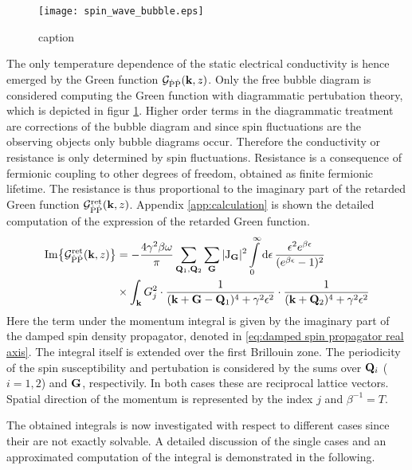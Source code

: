%
\begin{figure}
	\centering
	\texttt{[image: spin\_wave\_bubble.eps]}
	\caption{caption}
	\label{fig:spin wave bubble}
\end{figure}
%
The only temperature dependence of the static electrical conductivity is hence emerged by the Green function $\mathcal{G}_{\dot{\mathrm{P}}\dot{\mathrm{P}}}(\vb{k}, z)$.
Only the free bubble diagram is considered computing the Green function with diagrammatic pertubation theory, which is depicted in figur \ref{fig:spin wave bubble}.
Higher order terms in the diagrammatic treatment are corrections of the bubble diagram and since spin fluctuations are the observing objects only bubble diagrams occur.
Therefore the conductivity or resistance is only determined by spin fluctuations.
Resistance is a consequence of fermionic coupling to other degrees of freedom, obtained as finite fermionic lifetime.
The resistance is thus proportional to the imaginary part of the retarded Green function $\mathcal{G}_{\dot{\mathrm{P}}\dot{\mathrm{P}}}^{\mathrm{ret}}(\vb{k}, z)$.
Appendix \ref{app:calculation} is shown the detailed computation of the expression of the retarded Green function.
%
\begin{align}
	\Im{\mathcal{G}_{\dot{\mathrm{P}}\dot{\mathrm{P}}}^{\mathrm{ret}}(\vb{k}, z)} &= 
		-\frac{4 \gamma^{2} \beta \omega}{\pi}
		\sum\limits_{\vb{Q}_{1}, \vb{Q}_{2}}
		\sum\limits_{\vb{G}}
		\vert \mathrm{J}_{\vb{G}} \vert^{2}
		\int\limits_{0}^{\infty} \dd{\epsilon}
		\frac{\epsilon^{2} e^{\beta \epsilon}}{(e^{\beta \epsilon} - 1)^{2}}
		\notag \\
		&\times
		\int_{\vb{k}} G_{j}^{2} \cdot
		\frac{1}{(\vb{k}+\vb{G}-\vb{Q}_{1})^{4} + \gamma^{2} \epsilon^{2}} \cdot
		\frac{1}{(\vb{k} + \vb{Q}_{2})^{4} + \gamma^{2} \epsilon^{2}}
\end{align}
%
Here the term under the momentum integral is given by the imaginary part of the damped spin density propagator, denoted in \eqref{eq:damped spin propagator real axis}.
The integral itself is extended over the first Brillouin zone.
The periodicity of the spin susceptibility and pertubation is considered by the sums over $\vb{Q}_{i}$ ($i=1,2$) and $\vb{G}$, respectivily.
In both cases these are reciprocal lattice vectors.
Spatial direction of the momentum is represented by the index $j$ and $\beta^{-1} = T$.

The obtained integrals is now investigated with respect to different cases since their are not exactly solvable.
A detailed discussion of the single cases and an approximated computation of the integral is demonstrated in the following.


